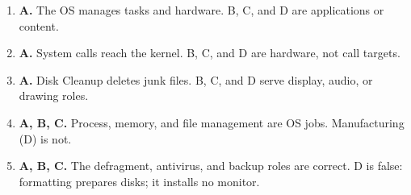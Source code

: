 \documentclass[11pt]{article}
\begin{document}
\begin{enumerate}[label=\textbf{Q\arabic*.}, leftmargin=*]
\item \textbf{A.} The OS manages tasks and hardware. B, C, and D are applications or content.
\item \textbf{A.} System calls reach the kernel. B, C, and D are hardware, not call targets.
\item \textbf{A.} Disk Cleanup deletes junk files. B, C, and D serve display, audio, or drawing roles.
\item \textbf{A, B, C.} Process, memory, and file management are OS jobs. Manufacturing (D) is not.
\item \textbf{A, B, C.} The defragment, antivirus, and backup roles are correct. D is false: formatting prepares disks; it installs no monitor.
\end{enumerate}
\def\JKSSBLessonID{52}\def\JKSSBAnswers{1}
\end{document}
